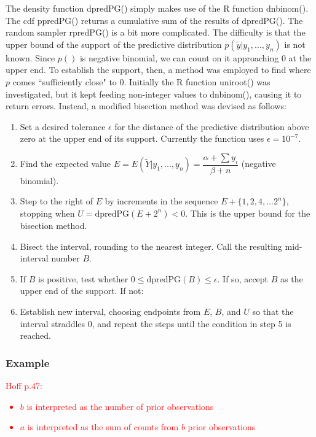 \documentclass[12pt, a4paper]{article}
\begin{document}
The density function dpredPG() simply makes use of the R function dnbinom().  The cdf ppredPG() returns a cumulative sum of the results of dpredPG().  The random sampler rpredPG() is a bit more complicated. The difficulty is that the upper bound of the support of the predictive distribution $p(\tilde{y}|y_1,...,y_n)$ is not known.  Since $p()$ is negative binomial, we can count on it approaching $0$ at the upper end.  To establish the support, then, a method was employed to find where $p$ comes ``sufficiently close" to $0$.  Initially the R function uniroot() was investigated, but it kept feeding non-integer values to dnbinom(), causing it to return errors.  Instead, a modified bisection method was devised as follows:\\

    \begin{enumerate}
      \item Set a desired tolerance $\epsilon$ for the distance of the predictive distribution above zero at the upper end of its support.  Currently the function uses $\epsilon = 10^{-7}$.
      \item Find the expected value $E = E(\tilde{Y}|y_1,...,y_n) = \dfrac{\alpha+\sum{y_i}}{\beta+n}$ (negative binomial).
      \item Step to the right of $E$ by increments in the sequence $E + \{1,2,4,...2^n\}$, stopping when $U=\text{dpredPG}\left(E + 2^n\right) < 0$.  This is the upper bound for the bisection method.
      \item Bisect the interval, rounding to the nearest integer.  Call the resulting mid-interval number $B$.
      \item If $B$ is positive, test whether $0 \leq \text{dpredPG}(B) \leq \epsilon$.  If so, accept $B$ as the upper end of the support.  If not:
      \item Establish new interval, choosing endpoints from $E$, $B$, and $U$ so that the interval straddles $0$, and repeat the steps until the condition in step 5 is reached.
    \end{enumerate}

    \subsubsection{Example}

\textcolor{red}{Hoff p.47:
  \begin{itemize}
    \item $b$ is interpreted as the number of prior observations
    \item $a$ is interpreted as the sum of counts from $b$ prior observations
  \end{itemize}
}
\end{document}
